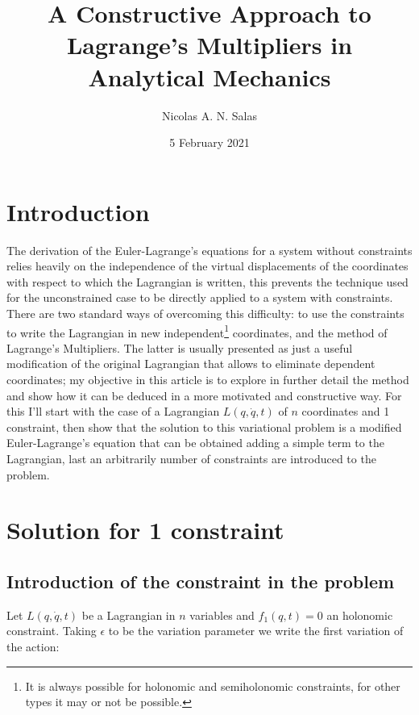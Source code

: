 \documentclass{article}
\title{A Constructive Approach to Lagrange's Multipliers in Analytical Mechanics}
\author{Nicolas A. N. Salas  }
\date{5 February 2021}
\begin{document}
\maketitle

\section{Introduction}
The derivation of the Euler-Lagrange's equations for a system without constraints relies heavily on the independence of the virtual displacements of the coordinates with respect to which the Lagrangian is written, this prevents the technique used for the unconstrained case to be directly applied to a system with constraints. There are two standard ways of overcoming this difficulty: to use the constraints to write the Lagrangian in new independent\footnote{ It is always possible for holonomic and semiholonomic constraints, for other types it may or not be possible. } coordinates, and the method of Lagrange's Multipliers. The latter is usually presented as just a useful modification of the original Lagrangian that allows to eliminate dependent coordinates; my objective in this article is to explore in further detail the method and show how it can be deduced in a more motivated and constructive way. For this I'll start with the case of a Lagrangian $L(q,\dot{q},t)$ of $n$ coordinates and 1 constraint, then show that the solution to this variational problem is a modified Euler-Lagrange's equation that can be obtained adding a simple term to the Lagrangian, last an arbitrarily number of constraints are introduced to the problem.

\section{Solution for 1 constraint}
\subsection{Introduction of the constraint in the problem} \label{introduction of the constraint in the problem}
Let $L(q,\dot{q},t)$ be a Lagrangian in $n$ variables and $f_1(q,t)=0$ an holonomic constraint. Taking $\epsilon$ to be the variation parameter we write the first variation of the action:
\end{document}
